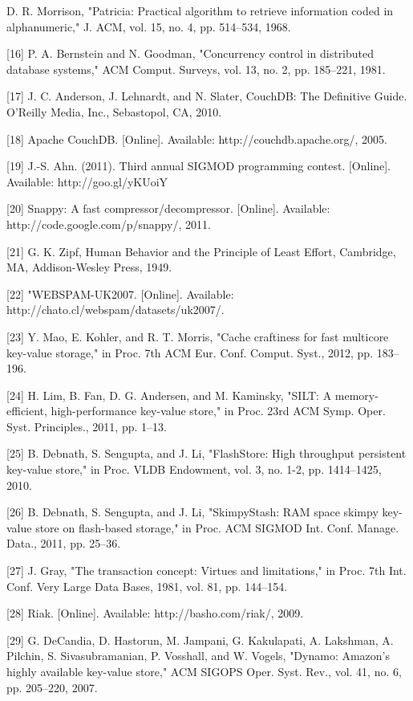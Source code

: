 \begin{flushleft}
[15] D. R. Morrison, "Patricia: Practical algorithm to retrieve information coded in alphanumeric," J. ACM, vol. 15, no. 4, pp. 514–534, 1968.

[16] P. A. Bernstein and N. Goodman, "Concurrency control in distributed database systems," ACM Comput. Surveys, vol. 13, no. 2, pp. 185–221, 1981.

[17] J. C. Anderson, J. Lehnardt, and N. Slater, CouchDB: The Definitive Guide. O’Reilly Media, Inc., Sebastopol, CA, 2010.

[18] Apache CouchDB. [Online]. Available: http://couchdb.apache.org/, 2005.

[19] J.-S. Ahn. (2011). Third annual SIGMOD programming contest. [Online]. Available: http://goo.gl/yKUoiY

[20] Snappy: A fast compressor/decompressor. [Online]. Available: http://code.google.com/p/snappy/, 2011.

[21] G. K. Zipf, Human Behavior and the Principle of Least Effort, Cambridge, MA, Addison-Wesley Press, 1949.

[22] "WEBSPAM-UK2007. [Online]. Available: http://chato.cl/webspam/datasets/uk2007/.

[23] Y. Mao, E. Kohler, and R. T. Morris, "Cache craftiness for fast multicore key-value storage," in Proc. 7th ACM Eur. Conf. Comput. Syst., 2012, pp. 183–196.

[24] H. Lim, B. Fan, D. G. Andersen, and M. Kaminsky, "SILT: A memory-efficient, high-performance key-value store," in Proc. 23rd ACM Symp. Oper. Syst. Principles., 2011, pp. 1–13.

[25] B. Debnath, S. Sengupta, and J. Li, "FlashStore: High throughput persistent key-value store," in Proc. VLDB Endowment, vol. 3, no. 1-2, pp. 1414–1425, 2010.

[26] B. Debnath, S. Sengupta, and J. Li, "SkimpyStash: RAM space skimpy key-value store on flash-based storage," in Proc. ACM SIGMOD Int. Conf. Manage. Data., 2011, pp. 25–36.

[27] J. Gray, "The transaction concept: Virtues and limitations," in Proc. 7th Int. Conf. Very Large Data Bases, 1981, vol. 81, pp. 144–154.

[28] Riak. [Online]. Available: http://basho.com/riak/, 2009.

[29] G. DeCandia, D. Hastorun, M. Jampani, G. Kakulapati, A. Lakshman, A. Pilchin, S. Sivasubramanian, P. Vosshall, and W. Vogels, "Dynamo: Amazon’s highly available key-value store," ACM SIGOPS Oper. Syst. Rev., vol. 41, no. 6, pp. 205–220, 2007.


\end{flushleft}
